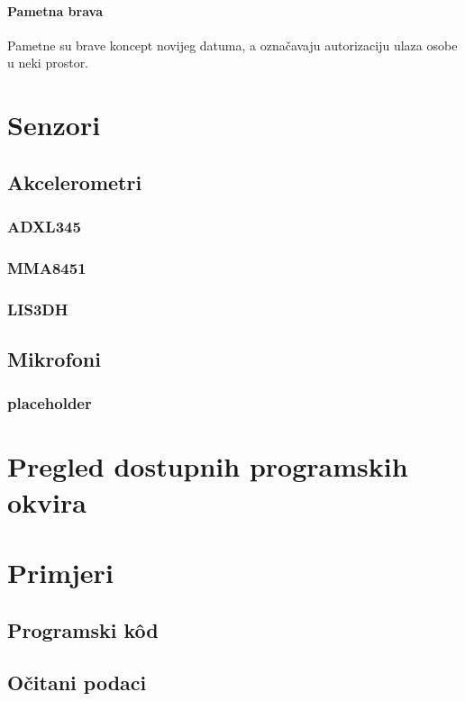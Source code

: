\documentclass[12pt,a4paper]{article}
\begin{document}
	\paragraph{Pametna brava} %
	\label{par:smart_lock}
		Pametne su brave koncept novijeg datuma, a označavaju autorizaciju ulaza osobe u neki prostor.


\newpage


\section{Senzori}
	\subsection{Akcelerometri}
		\subsubsection{ADXL345}
		\subsubsection{MMA8451}
		\subsubsection{LIS3DH}

	\subsection{Mikrofoni}
		\subsubsection{placeholder}
\newpage
\section{Pregled dostupnih programskih okvira}

\newpage
\section{Primjeri}
	\subsection{Programski kôd}
	\subsection{Očitani podaci}
\end{document}
